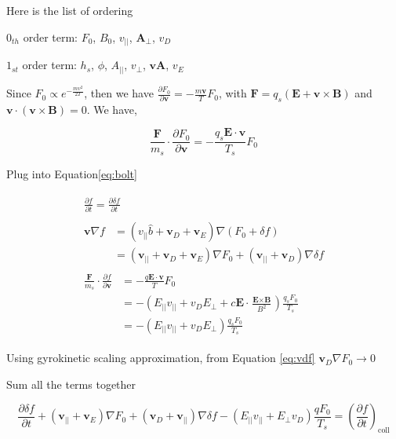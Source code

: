 Here is the list of ordering

$0_{th}$ order term: $F_0$, $B_0$, $v_{||}$, $\textbf{A}_{\perp}$, $v_D$

$1_{st}$ order term: $h_s$, $\phi$, $A_{||}$, $v_{\perp}$, $\textbf{vA}$, $v_E$

Since $F_0 \propto e^{-\frac{mv^2}{2T}}$, then we have $\frac{\partial F_0}{\partial \mathbf{v}} =- \frac{m\textbf{v}}{T}F_0$, with $\textbf{F}=q_s(\textbf{E}+\textbf{v}\times \textbf{B})$ and $\textbf{v}\cdot (\textbf{v} \times \textbf{B})=0$. We have, 

\begin{equation}
    \frac{\mathbf{F}}{m_s} \cdot \frac{\partial F_0}{\partial \mathbf{v}} = -\frac{q_s\textbf{E}\cdot \textbf{v}}{T_s}F_0
\end{equation}

Plug into Equation\ref{eq:bolt}

\begin{eqnarray}
    \begin{aligned}
     \frac{\partial f}{\partial t} =\frac{\partial \delta f}{\partial t}
     \end{aligned}\\
     \begin{aligned}
     \textbf{v}\nabla f {}&=  (v_{||}\hat{b}+\textbf{v}_D+\textbf{v}_E) \nabla(F_0+\delta f)\\
     &=(\textbf{v}_{||}+\textbf{v}_D+\textbf{v}_E) \nabla F_0 + (\textbf{v}_{||} +\textbf{v}_D)\nabla \delta f
     \end{aligned}\\
     \begin{aligned}
        \frac{\mathbf{F}}{m_s} \cdot \frac{\partial f}{\partial \mathbf{v}}{}&=-\frac{q\textbf{E}\cdot \textbf{v}}{T}F_0\\
        &=-(E_{||}v_{||}+v_D E_{\perp}+c\textbf{E} \cdot \frac{\textbf{E}\times \textbf{B}}{B^2})\frac{q_sF_0}{T_s}\\
        &=-(E_{||}v_{||}+v_D E_{\perp})\frac{q_sF_0}{T_s}
     \end{aligned}
\end{eqnarray}

Using gyrokinetic scaling approximation, from Equation \ref{eq:vdf} $\textbf{v}_D\nabla F_0\rightarrow0$

Sum all the terms together

\begin{equation}
    \frac{\partial \delta f}{\partial t}
    +(\textbf{v}_{||}+\textbf{v}_E) \nabla F_0 
    + (\textbf{v}_D+\textbf{v}_{||})\nabla \delta f
    -(E_{||}v_{||}+E_{\perp}v_D)\frac{qF_0}{T_s}
    =\left(\frac{\partial f}{\partial t}\right)_{\mathrm{coll}}
    \label{eq:temp21}
\end{equation}

